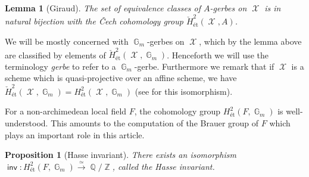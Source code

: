 \documentclass{article}
\DeclareMathOperator{\inv}{\mathsf{inv}}
\DeclareMathOperator{\Xc}{\mathcal{X}}
\DeclareMathOperator{\Zb}{\mathbb{Z}}
\DeclareMathOperator{\G}{\mathbb{G}}
\DeclareMathOperator{\Qb}{\mathbb{Q}}
\theoremstyle{definition}
\theoremstyle{plain}
\newtheorem{proposition}[definition]{Proposition}
\newtheorem{lemma}[definition]{Lemma}
\begin{document}
\begin{lemma}[Giraud]
The set of equivalence classes of $A$-gerbes on $\Xc$ is in natural bijection with the \v Cech cohomology group $\check H^2_{\text{\'et}}(\Xc,A)$. 
\end{lemma}

We will be mostly concerned with $\G_m$-gerbes on $\Xc$, which by the lemma above are classified by elements of $\check H^2_{\text{\'et}}(\Xc,\G_m)$. Henceforth we will use the terminology \emph{gerbe} to refer to a $\G_m$-gerbe. Furthermore we remark that if $\Xc$ is a scheme which is quasi-projective over an affine scheme, we have $\check H^2_{\text{\'et}}(\Xc,\G_m) = H^2_{\text{\'et}}(\Xc,\G_m)$ (see \cite[Theorem 2.17]{MR559531} for this isomorphism). 

For a non-archimedean local field $F$, the cohomology group $H^2_{\text{\'et}}(F,\G_m)$ is well-understood. This amounts to the computation of the Brauer group of $F$ which plays an important role in this article.

\begin{proposition}[Hasse invariant]\label{prop:Hasse}
There exists an isomorphism $\inv\colon H^2_{\text{\'et}}(F,\G_m) \xrightarrow{\simeq} \Qb/\Zb$, called the \emph{Hasse invariant}.
\end{proposition}
\end{document}

